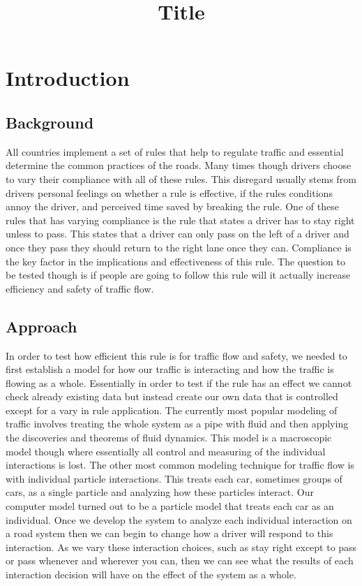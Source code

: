 \documentclass{amsart}
\title{Title}
\begin{document}
\maketitle

\section{\bfseries{Introduction}}
	\subsection{Background}
		All countries implement a set of rules that help to regulate traffic and essential determine the common practices of the roads.  Many times though drivers choose to vary their compliance with all of these rules.  This disregard usually stems from drivers personal feelings on whether a rule is effective, if the rules conditions annoy the driver, and perceived time saved by breaking the rule.  One of these rules that has varying compliance is the rule that states a driver has to stay right unless to pass.  This states that a driver can only pass on the left of a driver and once they pass they should return to the right lane once they can.  Compliance is the key factor in the implications and effectiveness of this rule.  The question to be tested though is if people are going to follow this rule will it actually increase efficiency and safety of traffic flow. 
	
	\subsection{Approach}
		In order to test how efficient this rule is for traffic flow and safety, we needed to first establish a model for how our traffic is interacting and how the traffic is flowing as a whole. Essentially in order to test if the rule has an effect we cannot check already existing data but instead create our own data that is controlled except for a vary in rule application. The currently most popular modeling of traffic involves treating the whole system as a pipe with fluid and then applying the discoveries and theorems of fluid dynamics.  This model is a macroscopic model though where essentially all control and measuring of the individual interactions is lost.  The other most common modeling technique for traffic flow is with individual particle interactions.  This treats each car, sometimes groups of cars, as a single particle and analyzing how these particles interact.  Our computer model turned out to be a particle model that treats each car as an individual.  Once we develop the system to analyze each individual interaction on a road system then we can begin to change how a driver will respond to this interaction.  As we vary these interaction choices, such as stay right except to pass or pass whenever and wherever you can, then we can see what the results of each interaction decision will have on the effect of the system as a whole.  
\end{document}
